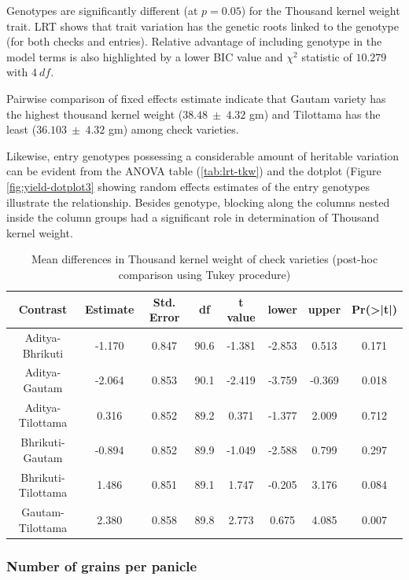 \documentclass[12pt,oneside]{dukestatscithesis} %
\begin{document}
Genotypes are significantly different (at \(p = 0.05\)) for the Thousand kernel weight trait. LRT shows that trait variation has the genetic roots linked to the genotype (for both checks and entries). Relative advantage of including genotype in the model terms is also highlighted by a lower BIC value and \(\chi^2\) statistic of \(10.279\) with \(4\ df\).

Pairwise comparison of fixed effects estimate indicate that Gautam variety has the highest thousand kernel weight (\(38.48\ \pm\ 4.32\) gm) and Tilottama has the least (\(36.103\ \pm\ 4.32\) gm) among check varieties.

Likewise, entry genotypes possessing a considerable amount of heritable variation can be evident from the ANOVA table (\ref{tab:lrt-tkw}) and the dotplot (Figure \ref{fig:yield-dotplot3} showing random effects estimates of the entry genotypes illustrate the relationship. Besides genotype, blocking along the columns nested inside the column groups had a significant role in determination of Thousand kernel weight.
\begin{table}[H]

\caption{\label{tab:yield-meanconf-tab3}Mean differences in Thousand kernel weight of check varieties (post-hoc comparison using Tukey procedure)}
\centering
\begin{tabular}[t]{cccccccc}
\toprule
Contrast & Estimate & Std. Error & df & t value & lower & upper & Pr(>|t|)\\
\midrule
Aditya-Bhrikuti & -1.170 & 0.847 & 90.6 & -1.381 & -2.853 & 0.513 & 0.171\\
Aditya-Gautam & -2.064 & 0.853 & 90.1 & -2.419 & -3.759 & -0.369 & 0.018\\
Aditya-Tilottama & 0.316 & 0.852 & 89.2 & 0.371 & -1.377 & 2.009 & 0.712\\
Bhrikuti-Gautam & -0.894 & 0.852 & 89.9 & -1.049 & -2.588 & 0.799 & 0.297\\
Bhrikuti-Tilottama & 1.486 & 0.851 & 89.1 & 1.747 & -0.205 & 3.176 & 0.084\\
Gautam-Tilottama & 2.380 & 0.858 & 89.8 & 2.773 & 0.675 & 4.085 & 0.007\\
\bottomrule
\end{tabular}
\end{table}
\hypertarget{number-of-grains-per-panicle}{%
\subsubsection{Number of grains per panicle}\label{number-of-grains-per-panicle}}
\end{document}
